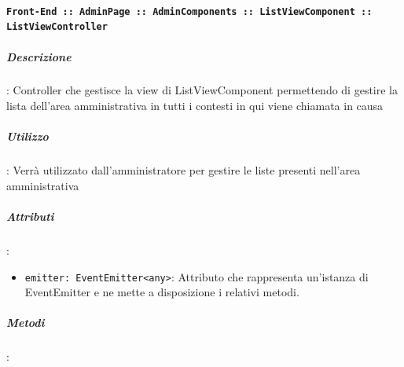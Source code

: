 \documentclass[../DefinizioneDiProdotto_v2.0.0.tex]{subfiles}
\begin{document}
			      \paragraph{\texttt{Front-End :: AdminPage :: AdminComponents :: ListViewComponent :: ListViewController}}
			      	\subparagraph{Descrizione}: Controller che gestisce la view di ListViewComponent permettendo di gestire la lista dell'area amministrativa in tutti i contesti in qui viene chiamata in causa
			      	\subparagraph{Utilizzo}: Verrà utilizzato dall'amministratore per gestire le liste presenti nell'area amministrativa
			      	\subparagraph{Attributi}:
			      	      \begin{itemize}
			      	      	\item \texttt{emitter: EventEmitter<any>}: Attributo che rappresenta un'istanza di EventEmitter e ne mette a disposizione i relativi metodi.
			      	      \end{itemize}
			      	\subparagraph{Metodi}:
\end{document}
